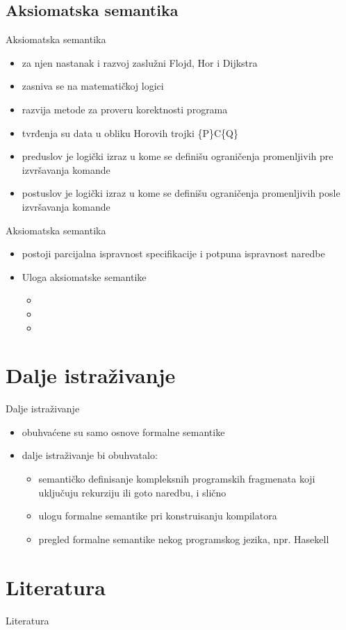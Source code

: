 \documentclass{beamer}
\begin{document}
\subsection{Aksiomatska semantika}
\begin{frame}{Aksiomatska semantika}
  \begin{itemize}
  \item za njen nastanak i razvoj zaslužni Flojd, Hor i Dijkstra
  \item zasniva se na matematičkoj logici
  \item razvija metode za proveru korektnosti programa
   \item tvrđenja su data u obliku Horovih trojki \{P\}C\{Q\}
   \item preduslov je logički izraz u kome se definišu ograničenja promenljivih pre izvršavanja komande
   \item postuslov je logički izraz u kome se definišu ograničenja promenljivih posle izvršavanja komande
  \end{itemize}
\end{frame}

\begin{frame}{Aksiomatska semantika}
 \begin{itemize}
  \item postoji parcijalna ispravnost specifikacije i potpuna ispravnost naredbe
  \item Uloga aksiomatske semantike
  \begin{itemize}
  \item 
   \item 
   \item 
    \end{itemize} 
  \end{itemize} 
\end{frame}
\section{Dalje istraživanje}
\begin{frame}{Dalje istraživanje}
  \begin{itemize}
  \item obuhvaćene su samo osnove formalne semantike
  \item dalje istraživanje bi obuhvatalo:
  \begin{itemize}
  	 \item semantičko definisanje kompleksnih programskih fragmenata koji uključuju rekurziju ili goto naredbu, i slično
  	 \item ulogu formalne semantike pri konstruisanju kompilatora
  	 \item pregled formalne semantike nekog programskog jezika, npr. Hasekell
  \end{itemize}
  \end{itemize}
\end{frame}
\section{Literatura}
\begin{frame}{Literatura}
  
\end{frame}
\end{document}
